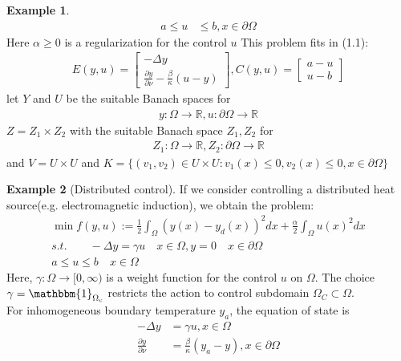 \documentclass[a4paper,11pt,fleqn]{book}
\theoremstyle{definition}
\newtheorem*{example}{Example}
\theoremstyle{remark}
\begin{document}
\begin{example}
\begin{align*}
	a \le u &\le b, x \in \partial \Omega
\end{align*}
Here $\alpha \geq 0$ is a regularization for the control $u$
This problem fits in (1.1):
\begin{align*}
	E(y, u) = 
	\begin{bmatrix}
		- \Delta y \\
		\frac{\partial y}{\partial \nu} - \frac{\beta}{\kappa}(u - y)
	\end{bmatrix}, 
	C(y, u) =
	\begin{bmatrix}
		a - u\\
		u - b
	\end{bmatrix}
\end{align*}
let $Y$ and $U$ be the suitable Banach spaces for 
\begin{align*}
	y : \Omega \rightarrow \mathbb{R}, u: \partial \Omega \rightarrow \mathbb{R}
\end{align*}
$Z = Z_1 \times Z_2$ with the suitable Banach space $Z_1, Z_2$ for 
\begin{align*}
	Z_1: \Omega \rightarrow \mathbb{R}, Z_2: \partial \Omega \rightarrow \mathbb{R}
\end{align*}
and $V = U \times U$ and $K = \{(v_1, v_2) \in U \times U: v_1(x) \le 0, v_2(x) \le 0, x \in \partial \Omega\}$
\end{example}

\begin{example}[Distributed control]
If we consider controlling a distributed heat source(e.g. electromagnetic induction), we obtain the problem:
\begin{align*}
	\min f(y, u):= \frac{1}{2} \int_\Omega (y(x) - y_d(x))^2 dx + \frac{\alpha}{2} \int_\Omega u(x)^2 dx\\
	s.t. \qquad - \Delta y = \gamma u \quad x \in\Omega, y= 0 \quad x \in \partial \Omega \\
	a \le u \le b \quad x \in \Omega
\end{align*}
	Here, $\gamma: \Omega \rightarrow [0, \infty)$ is a weight function for the control $u$ on $\Omega$. The choice $\gamma = \mathbbm{1}_{\Omega_c}$ restricts the action to control subdomain $\Omega_C \subset \Omega$. \\
	For inhomogeneous boundary temperature $y_a$, the equation of state is 
	\begin{align*}
		- \Delta y &= \gamma u, x \in \Omega\\
		\frac{\partial y}{\partial \nu} &= \frac{\beta}{\kappa}(y_a - y), x \in \partial \Omega
	\end{align*}
\end{example}
\end{document}
